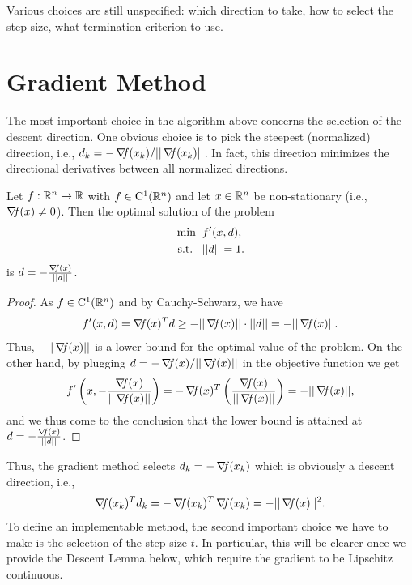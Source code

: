 \documentclass[10pt,a4paper]{article}
\begin{document}
\noindent Various choices are still unspecified: which direction to take, how to select the step size, what termination criterion to use.
\section{Gradient Method}
\noindent The most important choice in the algorithm above concerns the selection of the descent direction. One obvious choice is to pick the steepest (normalized) direction, i.e., $d_k =-\operatorname*{\mathit{\nabla \!f}}(x_k)/||\operatorname*{\mathit{\nabla \!f}}(x_k)||$. In fact, this direction minimizes the directional derivatives between all normalized directions. 
\begin{lemma}
	Let $f:\mathbb{R}^n\to\mathbb{R}$ with $f\in\mathord{\mathrm{C^1}}(\mathbb{R}^n)$ and let $x\in\mathbb{R}^n$ be non-stationary (i.e., $\operatorname*{\mathit{\nabla \!f}}(x)\neq0$). Then the optimal solution of the problem
	\begin{equation*}
		\begin{split}
			\min \;\; &f'(x,d),\\
			\text{s.t.} \;\;\;& ||d||=1.
		\end{split}
	\end{equation*}
is $d=-\frac{\operatorname*{\mathit{\nabla \!f}}(x)}{||d||}$.
\end{lemma}
\begin{proof}
	As $f\in \mathord{\mathrm{C^1}}(\mathbb{R}^n)$ and by Cauchy-Schwarz, we have 
	\begin{equation*}
		f'(x,d)=\operatorname*{\mathit{\nabla \!f}}(x)^Td \geq -||\operatorname*{\mathit{\nabla \!f}}(x)||\cdot ||d|| = -||\operatorname*{\mathit{\nabla \!f}}(x)||.
	\end{equation*}
Thus, $-||\operatorname*{\mathit{\nabla \!f}}(x)||$ is a lower bound for the optimal value of the problem. On the other hand, by plugging  $d = -\operatorname*{\mathit{\nabla \!f}}(x)/||\operatorname*{\mathit{\nabla \!f}}(x)||$ in the objective function we get 
\begin{equation*}
	f'\left(x,-\frac{\operatorname*{\mathit{\nabla \!f}}(x)}{||\operatorname*{\mathit{\nabla \!f}}(x)||}\right)=-\operatorname*{\mathit{\nabla \!f}}(x)^T\left(\frac{\operatorname*{\mathit{\nabla \!f}}(x)}{||\operatorname*{\mathit{\nabla \!f}}(x)||}\right)= -||\operatorname*{\mathit{\nabla \!f}}(x)||,
\end{equation*}
and we thus come to the conclusion that the lower bound is attained at $d=-\frac{\operatorname*{\mathit{\nabla \!f}}(x)}{||d||}$.
\end{proof}
\noindent Thus, the gradient method selects $d_k = -\operatorname*{\mathit{\nabla \!f}}(x_k)$ which is obviously a descent direction, i.e., 
\begin{equation*}
\operatorname*{\mathit{\nabla \!f}}(x_k)^Td_k = -\operatorname*{\mathit{\nabla \!f}}(x_k)^T\operatorname*{\mathit{\nabla \!f}}(x_k) = -||\operatorname*{\mathit{\nabla \!f}}(x)||^2.
\end{equation*}
\noindent To define an implementable method, the second important choice we have to make is the selection of the step size $t$. In particular, this will be clearer once we provide the Descent Lemma below, which require the gradient to be Lipschitz continuous. 
\end{document}
